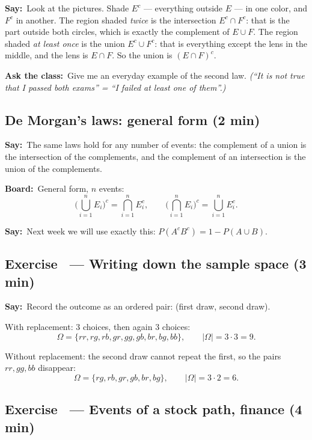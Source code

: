 \documentclass[11pt,a4paper,parskip=half]{scrartcl}
\newcommand{\Om}{\Omega}
\newcommand{\say}{\textbf{\color{teal}Say:}\ }
\newcommand{\board}{\textbf{\color{gold}Board:}\ }
\newcommand{\ask}{\textbf{\color{navy}Ask the class:}\ }
\newcommand{\slide}[1]{\marginpar{\raggedright\footnotesize\color{gray}slide #1}}
\begin{document}
\say Look at the pictures. Shade $E^c$ --- everything outside $E$ --- in one
color, and $F^c$ in another. The region shaded \emph{twice} is the
intersection $E^c\cap F^c$: that is the part outside both circles, which is
exactly the complement of $E\cup F$. The region shaded \emph{at least once}
is the union $E^c\cup F^c$: that is everything except the lens in the
middle, and the lens is $E\cap F$. So the union is $(E\cap F)^c$.

\ask Give me an everyday example of the second law. \emph{(``It is not true
	that I passed both exams'' = ``I failed at least one of them''.)}

\subsection{De Morgan's laws: general form (2 min)}\slide{30}

\say The same laws hold for any number of events: the complement of a union
is the intersection of the complements, and the complement of an
intersection is the union of the complements.

\board General form, $n$ events:
\[ \Big(\bigcup_{i=1}^n E_i\Big)^c = \bigcap_{i=1}^n E_i^c,\qquad
	\Big(\bigcap_{i=1}^n E_i\Big)^c = \bigcup_{i=1}^n E_i^c. \]

\say Next week we will use exactly this:
$P(A^cB^c) = 1-P(A\cup B)$.

\subsection{Exercise~ --- Writing down the sample space (3 min)}\slide{31}


\say Record the outcome as an ordered pair: (first draw, second draw).

With replacement: 3 choices, then again 3 choices:
\[ \Om = \{rr,rg,rb,gr,gg,gb,br,bg,bb\},\qquad |\Om| = 3\cdot3 = 9. \]

Without replacement: the second draw cannot repeat the first, so the pairs
$rr, gg, bb$ disappear:
\[ \Om = \{rg,rb,gr,gb,br,bg\},\qquad |\Om| = 3\cdot2 = 6. \]

\subsection{Exercise~ --- Events of a stock path, finance (4 min)}\slide{32}
\end{document}
